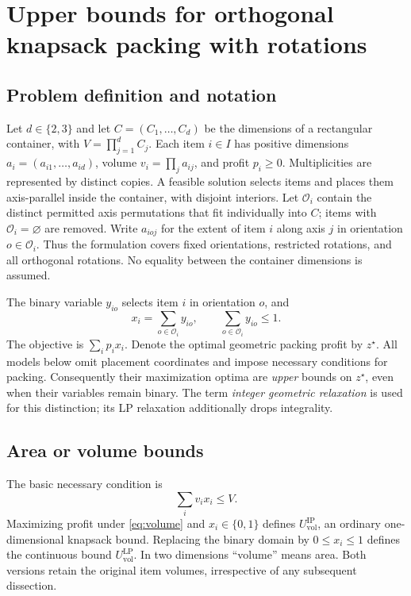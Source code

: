 \section{Upper bounds for orthogonal knapsack packing with rotations}
\label{sec:kp-bounds}

\subsection{Problem definition and notation}
Let $d\in\{2,3\}$ and let $C=(C_1,\ldots,C_d)$ be the dimensions of a
rectangular container, with $V=\prod_{j=1}^d C_j$. Each item $i\in I$ has
positive dimensions $a_i=(a_{i1},\ldots,a_{id})$, volume
$v_i=\prod_j a_{ij}$, and profit $p_i\geq0$. Multiplicities are represented
by distinct copies. A feasible solution selects items and places them
axis-parallel inside the container, with disjoint interiors. Let
$\mathcal O_i$ contain the distinct permitted axis permutations that fit
individually into $C$; items with $\mathcal O_i=\varnothing$ are removed.
Write $a_{ioj}$ for the extent of item $i$ along axis $j$ in orientation
$o\in\mathcal O_i$. Thus the formulation covers fixed orientations,
restricted rotations, and all orthogonal rotations. No equality between
the container dimensions is assumed.

The binary variable $y_{io}$ selects item $i$ in orientation $o$, and
\begin{equation}
 x_i=\sum_{o\in\mathcal O_i}y_{io},\qquad
 \sum_{o\in\mathcal O_i}y_{io}\leq1.                 \label{eq:orientation}
\end{equation}
The objective is $\sum_i p_i x_i$. Denote the optimal geometric packing
profit by $z^\star$. All models below omit placement coordinates and
impose necessary conditions for packing. Consequently their maximization
optima are \emph{upper} bounds on $z^\star$, even when their variables
remain binary. The term \emph{integer geometric relaxation} is used for
this distinction; its LP relaxation additionally drops integrality.

\subsection{Area or volume bounds}
The basic necessary condition is
\begin{equation}
 \sum_i v_i x_i\leq V.                             \label{eq:volume}
\end{equation}
Maximizing profit under \eqref{eq:volume} and $x_i\in\{0,1\}$ defines
$U_{\mathrm{vol}}^{\mathrm{IP}}$, an ordinary one-dimensional knapsack
bound. Replacing the binary domain by $0\leq x_i\leq1$ defines the
continuous bound $U_{\mathrm{vol}}^{\mathrm{LP}}$.
In two dimensions ``volume'' means area. Both versions retain the
original item volumes, irrespective of any subsequent dissection.

